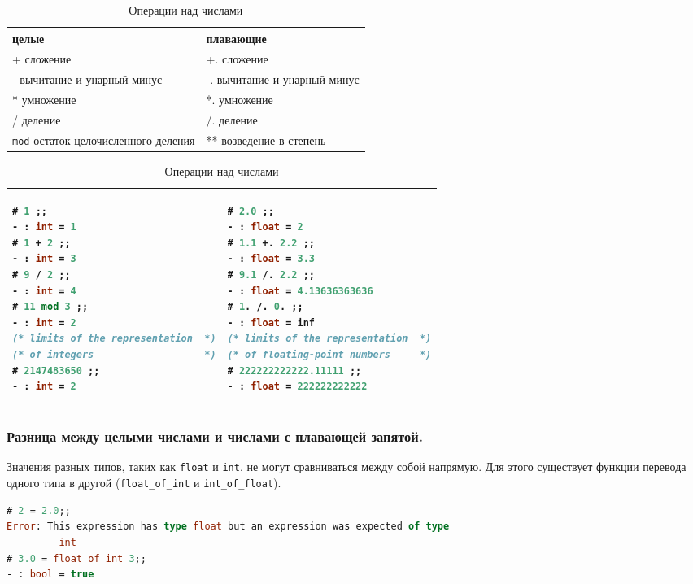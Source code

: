 \begin{table}[hl]
\begin{center}
	\caption{Операции над числами}
	\begin{tabular}{|p{7.2cm}|p{7.2cm}|}
	\hline
	целые & плавающие \\
	\hline
	+ сложение & +. сложение \\
	\hline
	- вычитание и унарный минус & -. вычитание и унарный минус \\
	\hline
	* умножение & *. умножение \\
	\hline
	/ деление & /. деление \\
	\hline
	\texttt{mod} остаток целочисленного деления & ** возведение в степень \\
	\hline
	\end{tabular}
	\begin{tabular}{|p{7.2cm}|p{7.2cm}|}
	\hline
{\begin{lstlisting}[language=OCaml,frame=none]
# 1 ;;
- : int = 1
# 1 + 2 ;;
- : int = 3
# 9 / 2 ;;
- : int = 4
# 11 mod 3 ;;
- : int = 2
(* limits of the representation  *)
(* of integers                   *)
# 2147483650 ;;
- : int = 2
\end{lstlisting}}
 &
{\begin{lstlisting}[language=OCaml,frame=none]
# 2.0 ;;
- : float = 2
# 1.1 +. 2.2 ;;
- : float = 3.3
# 9.1 /. 2.2 ;;
- : float = 4.13636363636
# 1. /. 0. ;;
- : float = inf
(* limits of the representation  *)
(* of floating-point numbers     *)
# 222222222222.11111 ;;
- : float = 222222222222
\end{lstlisting}}
\\
	\hline
	\end{tabular}
	\label{tbl:operations_on_numbers}
\end{center}
\end{table}

\subsubsection{Разница между целыми числами и числами с плавающей запятой.}

Значения разных типов, таких как \texttt{float} и \texttt{int}, не могут
сравниваться между собой напрямую. Для этого существует функции перевода одного
типа в другой (\texttt{float\_of\_int} и \texttt{int\_of\_float}).

\begin{lstlisting}[language=OCaml]
# 2 = 2.0;;
Error: This expression has type float but an expression was expected of type
         int
# 3.0 = float_of_int 3;;
- : bool = true
\end{lstlisting}

